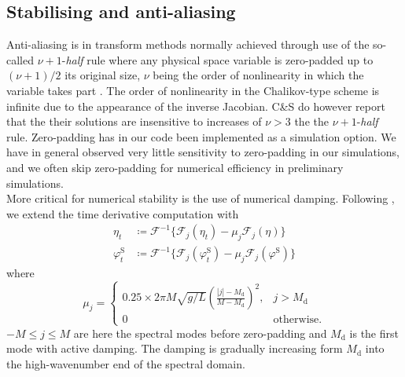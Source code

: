 \documentclass[a4paper,12pt]{article}
\newcommand{\mr}{\mathrm}
\newcommand{\mc}{\mathcal}
\renewcommand{\S}{^\mr{S}}
\renewcommand{\_}[1]{_\mr{#1}}
\newcommand{\rbr}[1]{\left(#1\right)}
\newcommand{\refCS}{C\&S}
\newcommand{\FF}{\mc F}
\begin{document}
\subsection*{Stabilising and anti-aliasing}
Anti-aliasing is in transform methods \citep{orszag1970transform} normally achieved through use of the so-called $\nu+1$-\textit{half} rule where any physical space variable is zero-padded up to $(\nu+1)/2$ its original size, $\nu$ being the order of nonlinearity in which the variable takes part \citep{bonnefoy2010}.
The order of nonlinearity in the Chalikov-type scheme is infinite due to the appearance of the inverse Jacobian. \refCS{} do however report that the their solutions are insensitive to increases of $\nu>3$ the the $\nu+1$-\textit{half} rule.
Zero-padding has in our code been implemented as a simulation option.
We have in general observed very little sensitivity to zero-padding in our simulations, and we often skip zero-padding for numerical efficiency in preliminary simulations.
\\


More critical for numerical stability is the use of numerical damping.
Following \citet{chalikov2005modeling}, we extend the time derivative computation with
\begin{subequations}
\begin{align}
\eta_t &\coloneqq \FF^{-1}\{\FF_j(\eta_t) - \mu_j \FF_j(\eta) \}\\
\varphi\S_t &\coloneqq  \FF^{-1}\{\FF_j(\varphi\S_t) - \mu_j \FF_j(\varphi\S) \}
\end{align}%
\label{eq:damping}%
\end{subequations}
where 
\begin{equation}
\mu_j = \begin{cases}
0.25\times 2\pi M \sqrt{g/L}\rbr{\frac{|j|-M\_d}{M-M\_d}}^2,& j>M\_d\\
0 & \text{otherwise.}
\end{cases}
\label{eq:damping_nu}
\end{equation}
$-M\leq j \leq M$ are here the spectral modes before zero-padding and $M\_d$ is the first mode with active damping.
The damping is gradually increasing form $M\_d$ into the high-wavenumber end of the spectral domain.
\end{document}
